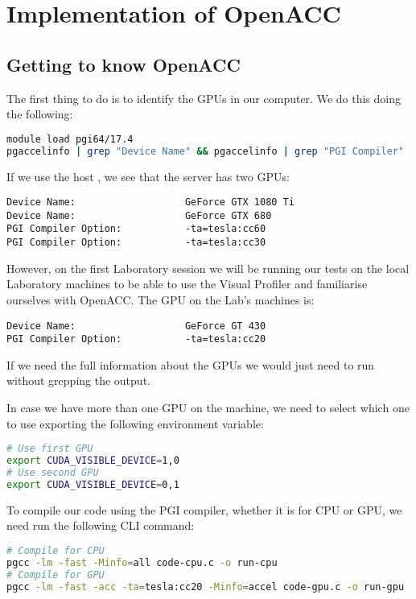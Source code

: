 \section{Implementation of OpenACC}

\subsection{Getting to know OpenACC}

The first thing to do is to identify the GPUs in our computer. We do this doing the following:
\begin{lstlisting}[language=bash]
module load pgi64/17.4
pgaccelinfo | grep "Device Name" && pgaccelinfo | grep "PGI Compiler"
\end{lstlisting}

If we use the host , we see that the server has two GPUs:
\begin{lstlisting}[style=output]
Device Name:                   GeForce GTX 1080 Ti
Device Name:                   GeForce GTX 680
PGI Compiler Option:           -ta=tesla:cc60
PGI Compiler Option:           -ta=tesla:cc30
\end{lstlisting}

However, on the first Laboratory session we will be running our tests on the local Laboratory machines to be able to use the Visual Profiler and familiarise ourselves with OpenACC. The GPU on the Lab's machines is:
\begin{lstlisting}[style=output]
Device Name:                   GeForce GT 430
PGI Compiler Option:           -ta=tesla:cc20
\end{lstlisting}

If we need the full information about the GPUs we would just need to run  without grepping the output.

In case we have more than one GPU on the machine, we need to select which one to use exporting the following environment variable:
\begin{lstlisting}[language=bash]
# Use first GPU
export CUDA_VISIBLE_DEVICE=1,0
# Use second GPU
export CUDA_VISIBLE_DEVICE=0,1
\end{lstlisting}

\bigskip
To compile our code using the PGI compiler, whether it is for CPU or GPU, we need run the following CLI command:
\begin{lstlisting}[language=bash]
# Compile for CPU
pgcc -lm -fast -Minfo=all code-cpu.c -o run-cpu
# Compile for GPU
pgcc -lm -fast -acc -ta=tesla:cc20 -Minfo=accel code-gpu.c -o run-gpu
\end{lstlisting}

